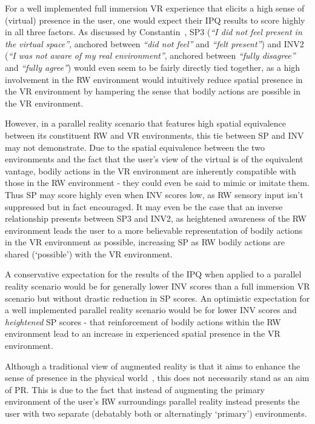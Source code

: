 For a well implemented full immersion VR experience that elicits a high sense of (virtual) presence in the user, one would expect their IPQ results to score highly in all three factors. As discussed by Constantin~\cite{Constantin2003a}, SP3 (\textit{``I did not feel present in the virtual space''}, anchored between \textit{``did not feel''} and \textit{``felt present''}) and INV2 (\textit{``I was not aware of my real environment''}, anchored between \textit{``fully disagree''} and \textit{``fully agree''}) would even seem to be fairly directly tied together, as a high involvement in the RW environment would intuitively reduce spatial presence in the VR environment by hampering the sense that bodily actions are possible in the VR environment.

However, in a parallel reality scenario that features high spatial equivalence between its constituent RW and VR environments, this tie between SP and INV may not demonstrate. Due to the spatial equivalence between the two environments and the fact that the user's view of the virtual is of the equivalent vantage, bodily actions in the VR environment are inherently compatible with those in the RW environment - they could even be said to mimic or imitate them. Thus SP may score highly even when INV scores low, as RW sensory input isn't suppressed but in fact encouraged. It may even be the case that an inverse relationship presents between SP3 and INV2, as heightened awareness of the RW environment leads the user to a more believable representation of bodily actions in the VR environment as possible, increasing SP as RW bodily actions are shared (`possible') with the VR environment.

A conservative expectation for the results of the IPQ when applied to a parallel reality scenario would be for generally lower INV scores than a full immersion VR scenario but without drastic reduction in SP scores. An optimistic expectation for a well implemented parallel reality scenario would be for lower INV scores and \textit{heightened} SP scores - that reinforcement of bodily actions within the RW environment lead to an increase in experienced spatial presence in the VR environment.

Although a traditional view of augmented reality is that it aims to enhance the sense of presence in the physical world~\cite{Waterworth2014}, this does not necessarily stand as an aim of PR. This is due to the fact that instead of augmenting the primary environment of the user's RW surroundings parallel reality instead presents the user with two separate (debatably both or alternatingly `primary') environments.

